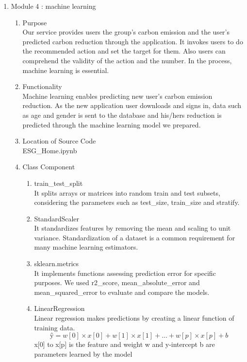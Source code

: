 \documentclass[11pt, conference]{IEEEtran}
\begin{document}
\begin{enumerate}[label=\arabic*]
    \item {\large{Module 4 : machine learning}}\\
    \begin{enumerate}[label=\alph*]
        \item Purpose\\
        Our service provides users the group’s carbon emission and the user’s predicted carbon reduction through the application. It invokes users to do the recommended action and set the target for them. Also users can comprehend the validity of the action and the number. In the process, machine learning is essential. \\
        \item Functionality\\
        Machine learning enables predicting new user’s carbon emission reduction. As the new application user downloads and signs in, data such as age and gender is sent to the database and his/hers reduction is predicted through the machine learning model we prepared.\\
        \item Location of Source Code\\
        ESG\_Home.ipynb
        \item Class Component\\
        \begin{enumerate}
            \item train\_test\_split\\
            It splits arrays or matrices into random train and test subsets, considering the parameters such as test\_size, train\_size and stratify.
            \item StandardScaler\\
            It standardizes features by removing the mean and scaling to unit variance. Standardization of a dataset is a common requirement for many machine learning estimators.
            \item sklearn.metrics\\
            It implements functions assessing prediction error for specific purposes. We used r2\_score, mean\_absolute\_error and mean\_squared\_error to evaluate and compare the models.
            \item LinearRegression\\
            Linear regression makes predictions by creating a linear function of training data.
            \[ŷ = w[0] × x[0] + w[1] × x[1] + … + w[p] × x[p] + b\]
            x[0] to x[p] is the feature and weight w and y-intercept b are parameters learned by the model

\end{enumerate}
\end{enumerate}
\end{enumerate}
\end{document}
